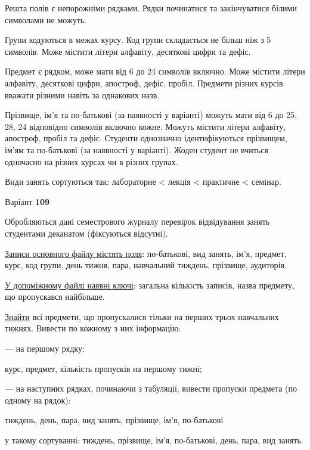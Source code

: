 \documentclass[11pt, ukrainian]{article}
\begin{document}
Решта полів є непорожніми рядками.
Рядки починатися та закінчуватися білими символами не можуть.

Групи кодуються в межах курсу.
Код групи складається не більш ніж з 5 символів.
Може містити літери алфавіту, десяткові цифри та дефіс.

Предмет є рядком, може мати від 6 до 24 символів включно.
Може містити літери алфавіту, десяткові цифри, апостроф, дефіс, пробіл.
Предмети різних курсів вважати різними навіть за однакових назв.

Прізвище, ім’я та по-батькові (за наявності у варіанті)
можуть мати від 6 до 25, 28, 24 відповідно символів включно кожне.
Можуть містити літери алфавіту, апостроф, пробіл та дефіс.
Студенти однозначно ідентифікуються прізвищем, ім’ям та по-батькові (за наявності у варіанті).
Жоден студент не вчиться одночасно на різних курсах чи в різних групах.

Види занять сортуються так: лабораторне < лекція < практичне < семінар.





\par
\newpage
{\center Варіант  \No \textbf { 109 }\par}
\bigskip
Обробляються дані семестрового журналу перевірок відвідування занять студентами деканатом (фіксуються відсутні). 

\underline{Записи основного файлу містять поля}: по-батькові, вид занять, ім’я, предмет, курс, код групи, день тижня, пара, навчальний тиждень, прізвище, аудиторія.

\underline{У допоміжному файлі наявні ключі}: загальна кількість записів, назва предмету, що пропускався найбільше.

\underline{Знайти} всі предмети, що пропускалися тільки на перших трьох навчальних тижнях. Вивести по кожному з них інформацію:\par
{\noindent}--- на першому рядку:\par
курс, предмет, кількість пропусків на першому тижні;

{\noindent}--- на наступних рядках, починаючи з табуляції, вивести пропуски предмета (по одному на рядок):\par
тиждень, день, пара, вид занять, прізвище, ім’я, по-батькові

{\noindent}у такому сортуванні: тиждень, прізвище, ім’я, по-батькові, день, пара, вид занять.
\end{document}
